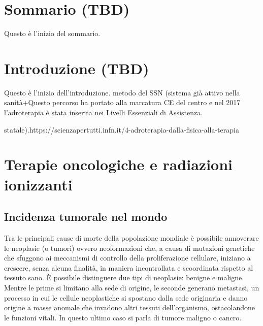 \documentclass[12pt,a4paper,twoside]{report}
\begin{document}
	\chapter*{Sommario (TBD)}
		Questo è l'inizio del sommario.
	\newpage
	\tableofcontents
	\newpage
	\chapter*{Introduzione (TBD)}
		Questo è l'inizio dell'introduzione. metodo del SSN (sistema già attivo nella sanità+Questo percorso ha portato alla marcatura CE del centro e nel 2017 l'adroterapia è stata inserita nei Livelli Essenziali di Assistenza.
		
		 statale).https://scienzapertutti.infn.it/4-adroterapia-dalla-fisica-alla-terapia
	\newpage
	
	
	\chapter{Terapie oncologiche e radiazioni ionizzanti}
	\section{Incidenza tumorale nel mondo}\label{sec:1.1}
	Tra le principali cause di morte della popolazione mondiale è possibile annoverare le neoplasie (o tumori) ovvero neoformazioni che, a causa di mutazioni genetiche che sfuggono ai meccanismi di controllo della proliferazione cellulare, iniziano a crescere, senza alcuna finalità, in maniera incontrollata e scoordinata rispetto al tessuto sano. \`E possibile distinguere due tipi di neoplasie: benigne e maligne. Mentre le prime si limitano alla sede di origine, le seconde generano metastasi, un processo in cui le cellule neoplastiche si spostano dalla sede originaria e danno origine a masse anomale che invadono altri tessuti dell'organismo, ostacolandone le funzioni vitali. In questo ultimo caso si parla di tumore maligno o cancro.
	
\end{document}
